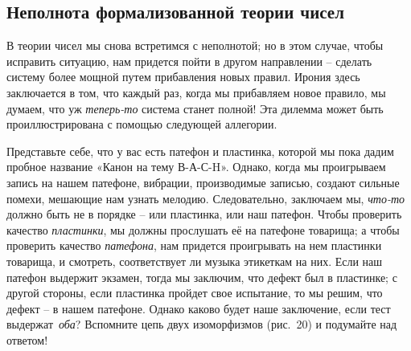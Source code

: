 \documentclass[../main.tex]{subfiles}
\begin{document}
\subsection{Неполнота формализованной теории чисел}

В теории чисел мы снова встретимся с неполнотой; но в этом случае, чтобы исправить ситуацию, нам придется пойти в другом направлении \--- сделать систему более мощной путем прибавления новых правил. Ирония здесь заключается в том, что каждый раз, когда мы прибавляем новое правило, мы думаем, что уж \emph{теперь-то} система станет полной! Эта дилемма может быть проиллюстрирована с помощью следующей аллегории.

Представьте себе, что у вас есть патефон и пластинка, которой мы пока дадим пробное название «Канон на тему В-А-С-H». Однако, когда мы проигрываем запись на нашем патефоне, вибрации, производимые записью, создают сильные помехи, мешающие нам узнать мелодию. Следовательно, заключаем мы, \emph{что-то} должно быть не в порядке \--- или пластинка, или наш патефон. Чтобы проверить качество \emph{пластинки}, мы должны прослушать её на патефоне товарища; а чтобы проверить качество \emph{патефона}, нам придется проигрывать на нем пластинки товарища, и смотреть, соответствует ли музыка этикеткам на них. Если наш патефон выдержит экзамен, тогда мы заключим, что дефект был в пластинке; с другой стороны, если пластинка пройдет свое испытание, то мы решим, что дефект \--- в нашем патефоне. Однако каково будет наше заключение, если тест выдержат~\emph{оба}?
Вспомните цепь двух изоморфизмов (рис.~20) и подумайте над ответом!
\end{document}
